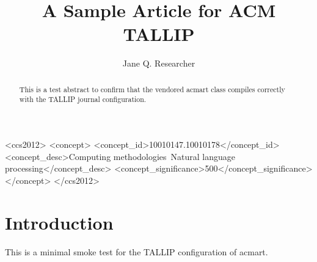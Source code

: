 \documentclass[acmsmall,screen]{acmart}
\begin{document}
\title{A Sample Article for ACM TALLIP}

\author{Jane Q. Researcher}

\begin{abstract}
This is a test abstract to confirm that the vendored acmart class
compiles correctly with the TALLIP journal configuration.
\end{abstract}

\begin{CCSXML}
<ccs2012>
<concept>
<concept_id>10010147.10010178</concept_id>
<concept_desc>Computing methodologies~Natural language processing</concept_desc>
<concept_significance>500</concept_significance>
</concept>
</ccs2012>
\end{CCSXML}



\maketitle

\section{Introduction}
This is a minimal smoke test for the TALLIP configuration of acmart.


\end{document}
